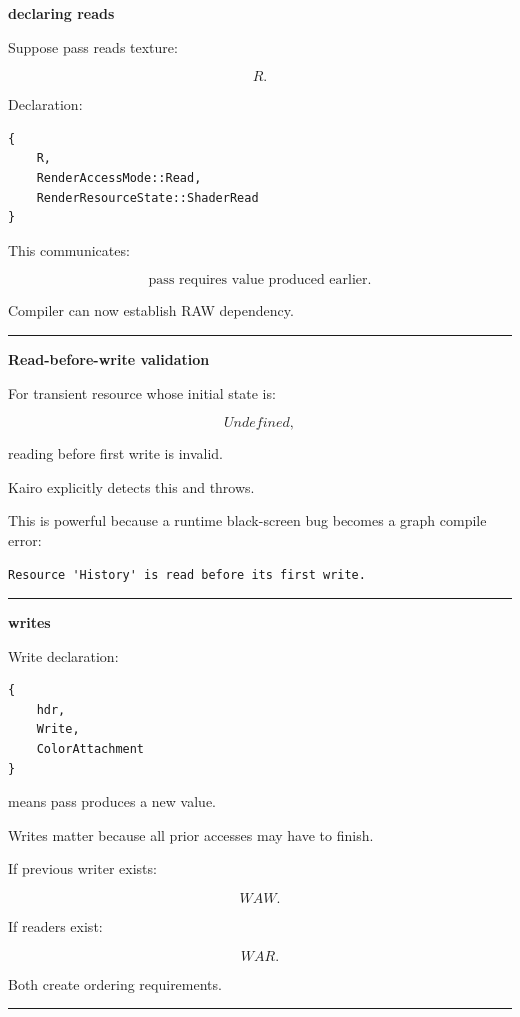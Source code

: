 \textbf{declaring reads}

Suppose pass reads texture:

\[
R.
\]

Declaration:

\begin{verbatim}
{
    R,
    RenderAccessMode::Read,
    RenderResourceState::ShaderRead
}
\end{verbatim}

This communicates:

\[
\boxed{
\text{pass requires value produced earlier}.
}
\]

Compiler can now establish RAW dependency.

\begin{center}\rule{0.5\linewidth}{0.5pt}\end{center}

\textbf{Read-before-write validation}

For transient resource whose initial state is:

\[
Undefined,
\]

reading before first write is invalid.

Kairo explicitly detects this and throws.

This is powerful because a runtime black-screen bug becomes a graph compile error:

\begin{verbatim}
Resource 'History' is read before its first write.
\end{verbatim}

\begin{center}\rule{0.5\linewidth}{0.5pt}\end{center}

\textbf{writes}

Write declaration:

\begin{verbatim}
{
    hdr,
    Write,
    ColorAttachment
}
\end{verbatim}

means pass produces a new value.

Writes matter because all prior accesses may have to finish.

If previous writer exists:

\[
WAW.
\]

If readers exist:

\[
WAR.
\]

Both create ordering requirements.

\begin{center}\rule{0.5\linewidth}{0.5pt}\end{center}

